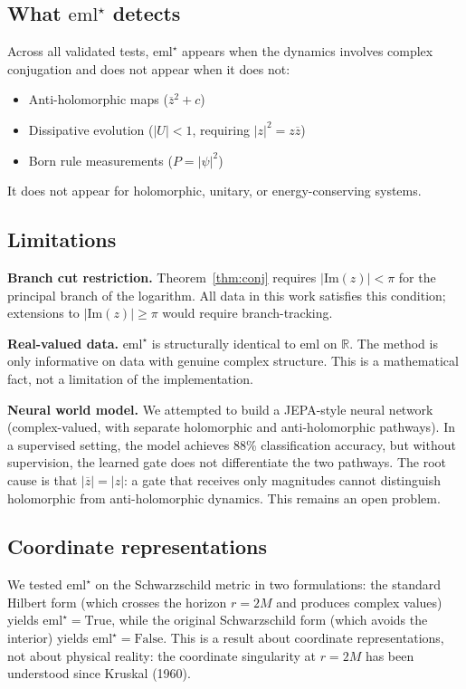 \documentclass[12pt,a4paper]{article}
\newcommand{\emlstar}{\mathrm{eml}^{\star}}
\newcommand{\eml}{\mathrm{eml}}
\newcommand{\conj}[1]{\overline{#1}}
\begin{document}
\subsection{What $\emlstar$ detects}

Across all validated tests, $\emlstar$ appears when
the dynamics involves complex conjugation and does not appear
when it does not:
\begin{itemize}
\item Anti-holomorphic maps ($\conj{z}^2 + c$)
\item Dissipative evolution ($|U| < 1$, requiring $|z|^2 = z\conj{z}$)
\item Born rule measurements ($P = |\psi|^2$)
\end{itemize}
It does not appear for holomorphic, unitary, or energy-conserving systems.

\subsection{Limitations}

\textbf{Branch cut restriction.}
Theorem~\ref{thm:conj} requires $|\mathrm{Im}(z)| < \pi$ for
the principal branch of the logarithm. All data in this work
satisfies this condition; extensions to $|\mathrm{Im}(z)| \geq \pi$
would require branch-tracking.

\textbf{Real-valued data.}
$\emlstar$ is structurally identical to $\eml$ on $\mathbb{R}$.
The method is only informative on data with genuine complex structure.
This is a mathematical fact, not a limitation of the implementation.

\textbf{Neural world model.}
We attempted to build a JEPA-style neural network (complex-valued,
with separate holomorphic and anti-holomorphic pathways).
In a supervised setting, the model achieves 88\% classification
accuracy, but without supervision, the learned gate does not
differentiate the two pathways.
The root cause is that $|\conj{z}| = |z|$: a gate that receives
only magnitudes cannot distinguish holomorphic from anti-holomorphic
dynamics. This remains an open problem.

\subsection{Coordinate representations}

We tested $\emlstar$ on the Schwarzschild metric in two formulations:
the standard Hilbert form (which crosses the horizon $r = 2M$ and
produces complex values) yields $\emlstar = \mathrm{True}$,
while the original Schwarzschild form (which avoids the interior)
yields $\emlstar = \mathrm{False}$.
This is a result about coordinate representations, not about
physical reality: the coordinate singularity at $r = 2M$ has been
understood since Kruskal (1960).
\end{document}
